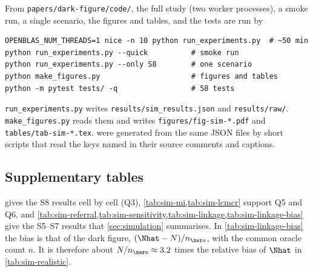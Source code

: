 From \texttt{papers/dark-figure/code/}, the full study (two worker processes), a smoke run, a single scenario, the figures and tables, and the tests are run by
\begin{verbatim}
OPENBLAS_NUM_THREADS=1 nice -n 10 python run_experiments.py  # ~50 min
python run_experiments.py --quick          # smoke run
python run_experiments.py --only S8        # one scenario
python make_figures.py                     # figures and tables
python -m pytest tests/ -q                 # 58 tests
\end{verbatim}
\texttt{run\_experiments.py} writes \texttt{results/sim\_results.json} and \texttt{results/raw/}. \texttt{make\_figures.py} reads them and writes \texttt{figures/fig-sim-*.pdf} and \texttt{tables/tab-sim-*.tex}.  were generated from the same JSON files by short scripts that read the keys named in their source comments and captions.

\subsection{Supplementary tables}\label{app:sim-tables}

 gives the S8 results cell by cell (Q3), \cref{tab:sim-mi,tab:sim-lcmcr} support Q5 and Q6, and \cref{tab:sim-referral,tab:sim-sensitivity,tab:sim-linkage,tab:sim-linkage-bias} give the S5--S7 results that \cref{sec:simulation} summarises. In \cref{tab:sim-linkage-bias} the bias is that of the dark figure, $(\Nhat-N)/n_{\zero}$, with the common oracle count $n$. It is therefore about $N/n_{\zero}\approx3.2$ times the relative bias of $\Nhat$ in \cref{tab:sim-realistic}.

\begin{table}[tp]
\centering
\caption{Synthetic data, S8: the LE model generates the observed table (independent capture, $N=2000$, $R=200$ per cell; coverage MCSE about $1.5$ points). Naive: estimator applied to the LE table. Known: correction with the true $(\delta,\varepsilon)$. Audit: correction with audit-estimated rates (200 records, 100 linked edges). Known$^-$: interval without $v_{\mathrm{link}}$, as in the first run. Known and Audit: interval with $v_{\mathrm{link}}$. Audit$^+$: with the audit variance added.}\label{tab:sim-le}
\small
\setlength{\tabcolsep}{4pt}
\simfit{}
\end{table}

\begin{table}[tp]
\centering
\caption{Synthetic data. MI with Gibbs linkage draws (approximate posterior under the plug-in FS pairwise model) against the point linkage. False merges, pairwise recall over all records, and $n-n^\star$ (clusters minus true recorded incidents) are means over replicates; draw columns average the first 5 draws of each replicate. BMA bias and coverage as in \cref{tab:sim-main}. S4: $R=100$; S5: $R=40$ per level.}\label{tab:sim-mi}
\small

\end{table}

